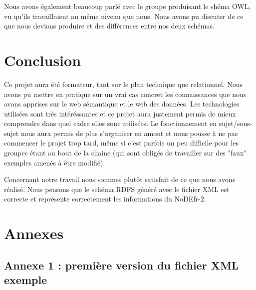 \documentclass{article}
\begin{document}
Nous avons également beaucoup parlé avec le groupe produisant le shéma OWL, vu qu'ils travaillaient au même niveau que nous. Nous avons pu discuter de ce que nous devions produire et des différences entre nos deux schémas. 

\newpage
\section{Conclusion}
Ce projet aura été formateur, tant sur le plan technique que relationnel. Nous avons pu mettre en pratique sur un vrai cas concret les connaissances que nous avons apprises sur le web sémantique et le web des données. Les technologies utilisées sont très intéréssantes et ce projet aura justement permis de mieux comprendre dans quel cadre elles sont utilisées. Le fonctionnement en sujet/sous-sujet nous aura permis de plus s'organiser en amont et nous pousse à ne pas commencer le projet trop tard, même si c'est parfois un peu difficile pour les groupes étant au bout de la chaine (qui sont obligés de travailler sur des "faux" exemples amenés à être modifié).

Concernant notre travail nous sommes plutôt satisfait de ce que nous avons réalisé. Nous pensons que le schéma RDFS généré avec le fichier XML est correcte et représente correctement les informations du NoDEfr-2.

\newpage
\section{Annexes}
\subsection{Annexe 1 : première version du fichier XML exemple}
\end{document}
